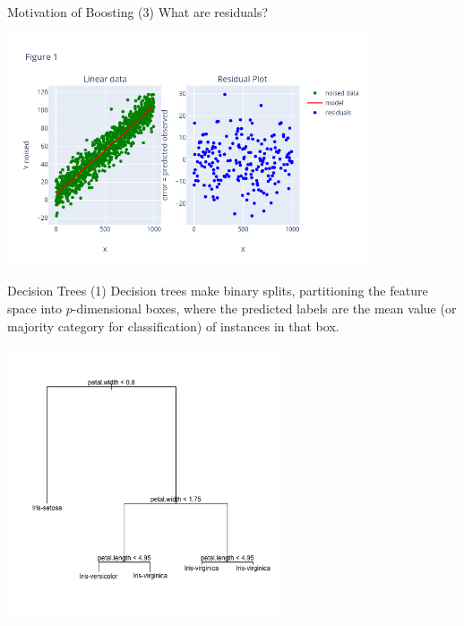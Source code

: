 \documentclass{beamer}
\begin{document}
    \begin{frame}{Motivation of Boosting (3)}
        What are residuals?
        \begin{center}
            \includegraphics[width=0.8\textwidth]{figures/residuals.png}
        \end{center}
    \end{frame}

    \begin{frame}{Decision Trees (1)}
        Decision trees make binary splits, partitioning the feature space into \alert{$p$-dimensional boxes}, where the predicted labels are the \alert{mean} value (or majority category for classification) of instances in that box.
        \begin{center}
            \includegraphics[width=0.6\textwidth]{figures/trees_fig_02.png}
        \end{center}
    \end{frame}
\end{document}
